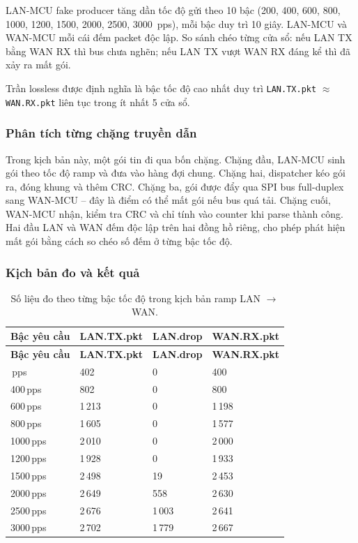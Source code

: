 LAN-MCU fake producer tăng dần tốc độ gửi theo 10 bậc (200, 400, 600, 800, 1000, 1200, 1500, 2000, 2500, 3000~pps), mỗi bậc duy trì 10 giây. LAN-MCU và WAN-MCU mỗi cái đếm packet độc lập. So sánh chéo từng cửa sổ: nếu LAN TX bằng WAN RX thì bus chưa nghẽn; nếu LAN TX vượt WAN RX đáng kể thì đã xảy ra mất gói.

Trần lossless được định nghĩa là bậc tốc độ cao nhất duy trì \texttt{LAN.TX.pkt} $\approx$ \texttt{WAN.RX.pkt} liên tục trong ít nhất 5 cửa sổ.

\subsubsection{Phân tích từng chặng truyền dẫn}

Trong kịch bản này, một gói tin đi qua bốn chặng. Chặng đầu, LAN-MCU sinh gói theo tốc độ ramp và đưa vào hàng đợi chung. Chặng hai, dispatcher kéo gói ra, đóng khung và thêm CRC. Chặng ba, gói được đẩy qua SPI bus full-duplex sang WAN-MCU -- đây là điểm có thể mất gói nếu bus quá tải. Chặng cuối, WAN-MCU nhận, kiểm tra CRC và chỉ tính vào counter khi parse thành công. Hai đầu LAN và WAN đếm độc lập trên hai đồng hồ riêng, cho phép phát hiện mất gói bằng cách so chéo số đếm ở từng bậc tốc độ.

\subsubsection{Kịch bản đo và kết quả}

\begin{longtable}{|p{3cm}|p{3cm}|p{3cm}|p{3cm}|}
    \caption{Số liệu đo theo từng bậc tốc độ trong kịch bản ramp LAN $\rightarrow$ WAN.}
    \label{tab:spi_ramp} \\
    \hline
    \textbf{Bậc yêu cầu} & \textbf{LAN.TX.pkt} & \textbf{LAN.drop} & \textbf{WAN.RX.pkt} \\ \hline
    \endfirsthead
    \hline
    \textbf{Bậc yêu cầu} & \textbf{LAN.TX.pkt} & \textbf{LAN.drop} & \textbf{WAN.RX.pkt} \\ \hline
    \endhead
    \hline
    \endfoot
    \endlastfoot
    200\,pps & 402 & 0 & 400 \\ \hline
    400\,pps & 802 & 0 & 800 \\ \hline
    600\,pps & 1\,213 & 0 & 1\,198 \\ \hline
    800\,pps & 1\,605 & 0 & 1\,577 \\ \hline
    1000\,pps & 2\,010 & 0 & 2\,000 \\ \hline
    1200\,pps & 1\,928 & 0 & 1\,933 \\ \hline
    1500\,pps & 2\,498 & 19 & 2\,453 \\ \hline
    2000\,pps & 2\,649 & 558 & 2\,630 \\ \hline
    2500\,pps & 2\,676 & 1\,003 & 2\,641 \\ \hline
    3000\,pps & 2\,702 & 1\,779 & 2\,667 \\ \hline
\end{longtable}

